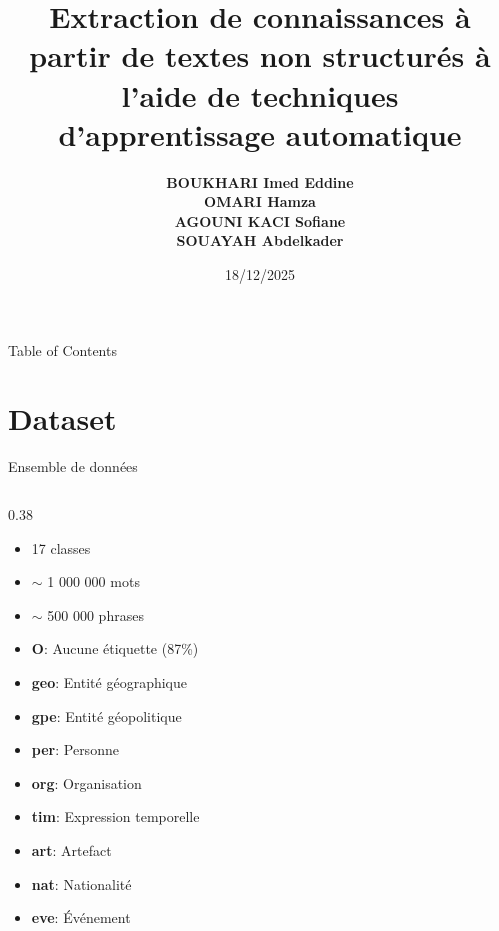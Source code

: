 \documentclass[10pt]{beamer}
\title[]{Extraction de connaissances à partir de textes non structurés à l'aide de techniques d'apprentissage automatique}
\author[\textbf{Recherche et extraction sémantique à partir de texte}]{
            { \bf BOUKHARI Imed Eddine}\\ 
            {\bf OMARI Hamza} \\ 
            {\bf AGOUNI KACI Sofiane} \\ 
            {\bf SOUAYAH Abdelkader} } %
\date[\textcolor{white}{18/12/2025}]{18/12/2025}
\begin{document}
\frame{\titlepage}

\begin{frame}{Table of Contents}
    \tableofcontents
\end{frame}

\section{Dataset}

\begin{frame}{Ensemble de données}
        \vspace{-0.6cm}
    \begin{columns}[T]
        \begin{column}{0.38\textwidth}
            \begin{tcolorbox}[colback=lightred!20, colframe=redforsnnu, title=Aperçu de l'ensemble de données]
                \begin{itemize}\scriptsize
                    \item 17 classes
                    \item $\sim$ 1 000 000 mots
                    \item $\sim$ 500 000 phrases
                \end{itemize}
            \end{tcolorbox}

            
            \begin{tcolorbox}[colback=middledered!20, colframe=darkred, title=Étiquettes d'entités]
                \begin{itemize}\scriptsize
                    \item \textbf{O}: Aucune étiquette (87\%)
                    \item \textbf{geo}: Entité géographique
                    \item \textbf{gpe}: Entité géopolitique
                    \item \textbf{per}: Personne
                    \item \textbf{org}: Organisation
                    \item \textbf{tim}: Expression temporelle
                    \item \textbf{art}: Artefact
                    \item \textbf{nat}: Nationalité
                    \item \textbf{eve}: Événement
                \end{itemize}
            \end{tcolorbox}
        \end{column}
        

\end{columns}
\end{frame}
\end{document}
